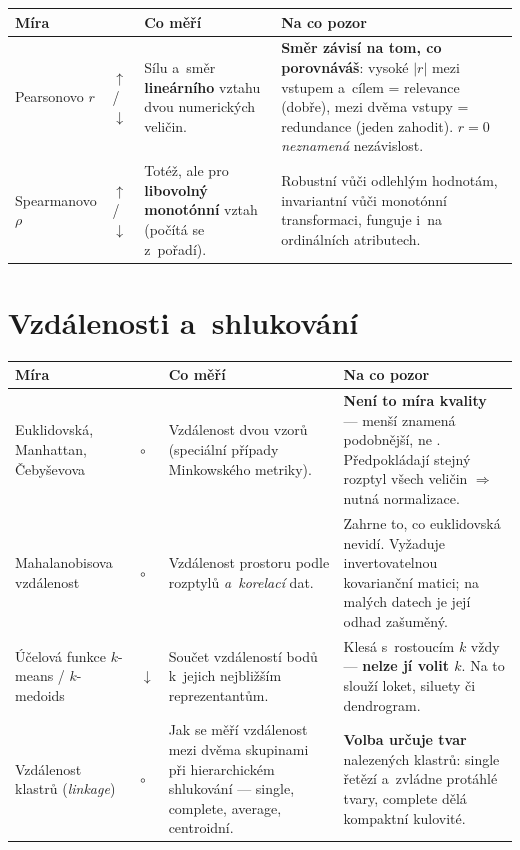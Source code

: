 \documentclass[11pt,a4paper]{article}
\makeatletter
\newcommand{\up}{\textcolor{upcol}{$\boldsymbol{\uparrow}$}}
\newcommand{\down}{\textcolor{downcol}{$\boldsymbol{\downarrow}$}}
\newcommand{\neut}{$\circ$}
\newenvironment{mirytab}{%
  \par\medskip\noindent\small
  \begin{tabular}{@{}>{\raggedright\arraybackslash}p{3.15cm}
                    >{\centering\arraybackslash}p{0.85cm}
                    >{\raggedright\arraybackslash}p{5.3cm}
                    >{\raggedright\arraybackslash}p{6.1cm}@{}}
  \toprule
  \textbf{Míra} & & \textbf{Co měří} & \textbf{Na co pozor} \\
  \midrule}%
  {\bottomrule\end{tabular}\par\medskip}
\makeatother
\begin{document}
\begin{mirytab}
Pearsonovo $r$ & \up/\down &
Sílu a~směr \textbf{lineárního} vztahu dvou numerických veličin. &
\textbf{Směr závisí na tom, co porovnáváš}: vysoké $|r|$ mezi vstupem a~cílem = relevance
(dobře), mezi dvěma vstupy = redundance (jeden zahodit). $r=0$ \emph{neznamená}
nezávislost. \\[2pt]

Spearmanovo $\rho$ & \up/\down &
Totéž, ale pro \textbf{libovolný monotónní} vztah (počítá se z~pořadí). &
Robustní vůči odlehlým hodnotám, invariantní vůči monotónní transformaci, funguje
i~na ordinálních atributech. \\
\end{mirytab}

\section{Vzdálenosti a~shlukování}

\begin{mirytab}
Euklidovská, Manhattan, Čebyševova & \neut &
Vzdálenost dvou vzorů (speciální případy Minkowského metriky). &
\textbf{Není to míra kvality} --- menší znamená podobnější, ne \uv{lepší}. Předpokládají
stejný rozptyl všech veličin $\Rightarrow$ nutná normalizace. \\[2pt]

Mahalanobisova vzdálenost & \neut &
Vzdálenost \uv{po narovnání} prostoru podle rozptylů \emph{a~korelací} dat. &
Zahrne to, co euklidovská nevidí. Vyžaduje invertovatelnou kovarianční matici;
na malých datech je její odhad zašuměný. \\[2pt]

Účelová funkce \newline $k$-means / $k$-medoids & \down &
Součet vzdáleností bodů k~jejich nejbližším reprezentantům. &
Klesá s~rostoucím $k$ vždy --- \textbf{nelze jí volit $k$}. Na to slouží loket, siluety
či dendrogram. \\[2pt]

Vzdálenost klastrů (\emph{linkage}) & \neut &
Jak se měří vzdálenost mezi dvěma skupinami při hierarchickém shlukování ---
single, complete, average, centroidní. &
\textbf{Volba určuje tvar} nalezených klastrů: single řetězí a~zvládne protáhlé tvary,
complete dělá kompaktní kulovité. \\
\end{mirytab}
\end{document}

